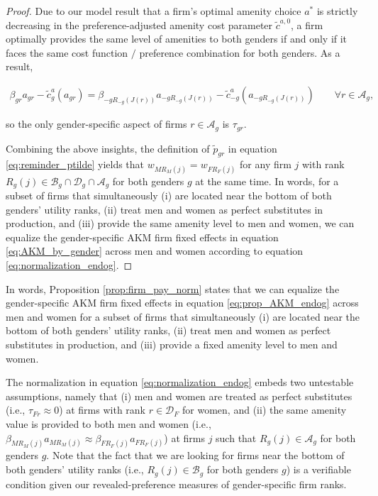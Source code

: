 \begin{proof}
    Due to our model result that a firm's optimal amenity choice $a^{*}$ is strictly decreasing in the preference-adjusted amenity cost parameter $\tilde{c}^{a,0}$, a firm optimally provides the same level of amenities to both genders if and only if it faces the same cost function $/$ preference combination for both genders. As a result,
    \begin{small}
        \begin{align}
            \beta_{gr} a_{gr} - \tilde{c}_{g}^{a}(a_{gr}) = \beta_{-gR_{-g}(J(r))} a_{-gR_{-g}(J(r))} - \tilde{c}_{-g}^{a}(a_{-gR_{-g}(J(r))}) \qquad \forall r \in \mathcal{A}_{g}, \label{eq:equal_amen_firms}
        \end{align}
    \end{small}
    so the only gender-specific aspect of firms $r \in \mathcal{A}_{g}$ is $\tau_{gr}$.

    Combining the above insights, the definition of $\tilde{p}_{gr}$ in equation \eqref{eq:reminder_ptilde} yields that $w_{MR_{M}(j)} = w_{FR_{F}(j)}$ for any firm $j$ with rank $R_{g}(j) \in \mathcal{B}_{g} \cap \mathcal{D}_{g} \cap \mathcal{A}_{g}$ for both genders $g$ at the same time. In words, for a subset of firms that simultaneously (i) are located near the bottom of both genders' utility ranks, (ii) treat men and women as perfect substitutes in production, and (iii) provide the same amenity level to men and women, we can equalize the gender-specific AKM firm fixed effects in equation \eqref{eq:AKM_by_gender} across men and women according to equation \eqref{eq:normalization_endog}.
\end{proof}
%
In words, Proposition \ref{prop:firm_pay_norm} states that we can equalize the gender-specific AKM firm fixed effects in equation \eqref{eq:prop_AKM_endog} across men and women for a subset of firms that simultaneously (i) are located near the bottom of both genders' utility ranks, (ii) treat men and women as perfect substitutes in production, and (iii) provide a fixed amenity level to men and women.

The normalization in equation \eqref{eq:normalization_endog} embeds two untestable assumptions, namely that (i) men and women are treated as perfect substitutes (i.e., $\tau_{Fr} \approx 0$) at firms with rank $r \in \mathcal{D}_{F}$ for women, and (ii) the same amenity value is provided to both men and women (i.e., $\beta_{MR_{M}(j)} a_{MR_{M}(j)} \approx \beta_{FR_{F}(j)} a_{FR_{F}(j)}$) at firms $j$ such that $R_{g}(j) \in \mathcal{A}_{g}$ for both genders $g$. Note that the fact that we are looking for firms near the bottom of both genders' utility ranks (i.e., $R_{g}(j) \in \mathcal{B}_{g}$ for both genders $g$) is a verifiable condition given our revealed-preference measures of gender-specific firm ranks.


